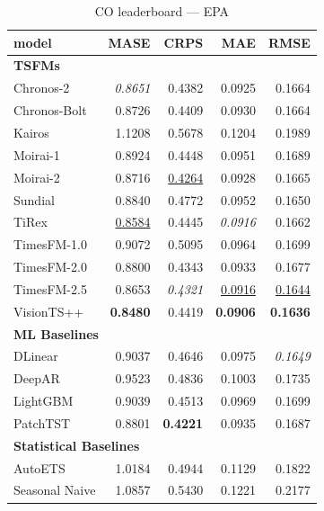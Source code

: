 \begin{table}[H]
\caption{CO leaderboard --- EPA}
\centering
\begin{small}
\begin{tabular}{lrrrr}
\toprule
model & MASE & CRPS & MAE & RMSE \\
\midrule
\multicolumn{5}{l}{\textbf{TSFMs}} \\
Chronos-2 & \textit{0.8651} & 0.4382 & 0.0925 & 0.1664 \\
Chronos-Bolt & 0.8726 & 0.4409 & 0.0930 & 0.1664 \\
Kairos & 1.1208 & 0.5678 & 0.1204 & 0.1989 \\
Moirai-1 & 0.8924 & 0.4448 & 0.0951 & 0.1689 \\
Moirai-2 & 0.8716 & \underline{0.4264} & 0.0928 & 0.1665 \\
Sundial & 0.8840 & 0.4772 & 0.0952 & 0.1650 \\
TiRex & \underline{0.8584} & 0.4445 & \textit{0.0916} & 0.1662 \\
TimesFM-1.0 & 0.9072 & 0.5095 & 0.0964 & 0.1699 \\
TimesFM-2.0 & 0.8800 & 0.4343 & 0.0933 & 0.1677 \\
TimesFM-2.5 & 0.8653 & \textit{0.4321} & \underline{0.0916} & \underline{0.1644} \\
VisionTS++ & \textbf{0.8480} & 0.4419 & \textbf{0.0906} & \textbf{0.1636} \\
\midrule
\multicolumn{5}{l}{\textbf{ML Baselines}} \\
DLinear & 0.9037 & 0.4646 & 0.0975 & \textit{0.1649} \\
DeepAR & 0.9523 & 0.4836 & 0.1003 & 0.1735 \\
LightGBM & 0.9039 & 0.4513 & 0.0969 & 0.1699 \\
PatchTST & 0.8801 & \textbf{0.4221} & 0.0935 & 0.1687 \\
\midrule
\multicolumn{5}{l}{\textbf{Statistical Baselines}} \\
AutoETS & 1.0184 & 0.4944 & 0.1129 & 0.1822 \\
Seasonal Naive & 1.0857 & 0.5430 & 0.1221 & 0.2177 \\
\bottomrule
\end{tabular}
\end{small}
\end{table}